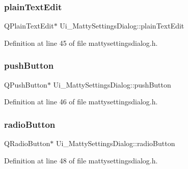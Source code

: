 \subsubsection{\texorpdfstring{plain\+Text\+Edit}{plainTextEdit}}
{\footnotesize\ttfamily Q\+Plain\+Text\+Edit$\ast$ Ui\+\_\+\+Matty\+Settings\+Dialog\+::plain\+Text\+Edit}



Definition at line 45 of file mattysettingsdialog.\+h.

\hypertarget{classUi__MattySettingsDialog_a9dc0075ea8668c036f7208db116b8361}{}\label{classUi__MattySettingsDialog_a9dc0075ea8668c036f7208db116b8361} 
\subsubsection{\texorpdfstring{push\+Button}{pushButton}}
{\footnotesize\ttfamily Q\+Push\+Button$\ast$ Ui\+\_\+\+Matty\+Settings\+Dialog\+::push\+Button}



Definition at line 46 of file mattysettingsdialog.\+h.

\hypertarget{classUi__MattySettingsDialog_a5e7e8269079472402cd9050c969df6c1}{}\label{classUi__MattySettingsDialog_a5e7e8269079472402cd9050c969df6c1} 
\subsubsection{\texorpdfstring{radio\+Button}{radioButton}}
{\footnotesize\ttfamily Q\+Radio\+Button$\ast$ Ui\+\_\+\+Matty\+Settings\+Dialog\+::radio\+Button}



Definition at line 48 of file mattysettingsdialog.\+h.

\hypertarget{classUi__MattySettingsDialog_aff88fbe355ba7e5946674126a6a2c326}{}\label{classUi__MattySettingsDialog_aff88fbe355ba7e5946674126a6a2c326} 
